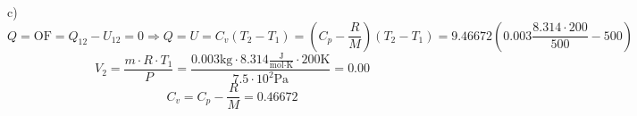 c) \\
\[
Q = \text{OF} = Q_{12} - U_{12} = 0 \Rightarrow Q = U = C_v (T_2 - T_1) = (C_p - \frac{R}{M}) (T_2 - T_1) = 9.46672 \left(0.003 \frac{8.314 \cdot 200}{500} - 500 \right)
\]
\[
V_2 = \frac{m \cdot R \cdot T_1}{P} = \frac{0.003 \text{kg} \cdot 8.314 \frac{\text{J}}{\text{mol} \cdot \text{K}} \cdot 200 \text{K}}{7.5 \cdot 10^2 \text{Pa}} = 0.00
\]
\[
C_v = C_p - \frac{R}{M} = 0.46672
\]